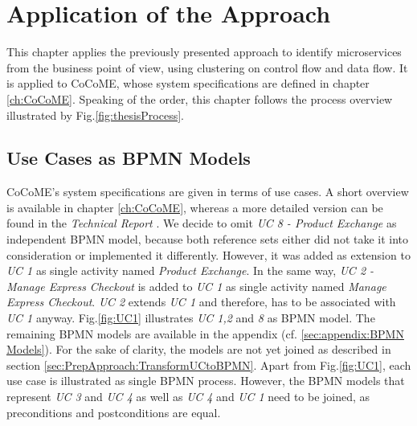\chapter{Application of the Approach}
\label{ch:SolutionApplication}
This chapter applies the previously presented approach to identify microservices from the business point of view, using clustering on control flow and data flow. It is applied to CoCoME, whose system specifications are defined in chapter \ref{ch:CoCoME}. Speaking of the order, this chapter follows the process overview illustrated by Fig.\ref{fig:thesisProcess}.

\section{Use Cases as BPMN Models}
\label{sec:SolutionApplication:TransformUseCases}
CoCoME's system specifications are given in terms of use cases. A short overview is available in chapter \ref{ch:CoCoME}, whereas a more detailed version can be found in the \textit{Technical Report} \cite{CoCoMETechnical}. We decide to omit  \textit{UC 8 - Product Exchange} as independent BPMN model, because both reference sets either did not take it into consideration or implemented it differently. However, it was added as extension to \textit{UC 1} as single activity named \textit{Product Exchange}. In the same way, \textit{UC 2 - Manage Express Checkout} is added to \textit{UC 1} as single activity named \textit{Manage Express Checkout}. \textit{UC 2} extends \textit{UC 1} and therefore, has to be associated with \textit{UC 1} anyway.  Fig.\ref{fig:UC1} illustrates \textit{UC 1,2} and \textit{8} as BPMN model. The remaining BPMN models are available in the appendix (cf. \ref{sec:appendix:BPMN Models}). For the sake of clarity, the models are not yet joined as described in section \ref{sec:PrepApproach:TransformUCtoBPMN}. Apart from Fig.\ref{fig:UC1}, each use case is illustrated as single BPMN process. However, the BPMN models that represent \textit{UC 3} and \textit{UC 4} as well as \textit{UC 4} and \textit{UC 1} need to be joined, as preconditions and postconditions are equal. 




